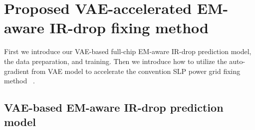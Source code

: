 \section{Proposed VAE-accelerated EM-aware IR-drop fixing method}
\label{sec:strategy}


First we introduce our VAE-based full-chip EM-aware IR-drop prediction model, the data preparation, and training.
Then we introduce how to utilize the auto-gradient from VAE model to accelerate the convention SLP power grid fixing method ~\cite{Sukharev:2019pg}.


\subsection{VAE-based EM-aware IR-drop prediction model}
\label{subsec:vae}




